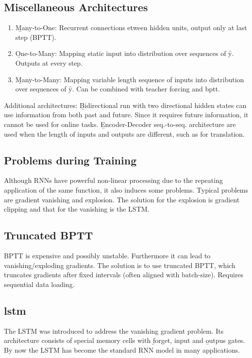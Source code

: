 \subsection{Miscellaneous Architectures}
\begin{enumerate}
    \item \b{Many-to-One:} Recurrent connections etween hidden units, output only at last step (BPTT).
    \item \b{One-to-Many:} Mapping static input into distribution over sequences of \f{y}. Outputs at every step.
    \item \b{Many-to-Many:} Mapping variable length sequence of inputs into distribution over sequences of \f{y}. Can be combined with teacher forcing and \ac{bptt}.
\end{enumerate}

Additional architectures: \b{Bidirectional \ac{rnn}} with two directional hidden states can use information from both past and future. Since it requires future information, it cannot be used for online tasks. \b{Encoder-Decoder seq.-to-seq.} architecture are used when the length of inputs and outputs are different, such as for translation.

\subsection{Problems during Training}
Although RNNs have powerful non-linear processing due to the repeating application of the same function, it also induces some problems. Typical problems are gradient vanishing and explosion. The solution for the explosion is gradient clipping and that for the vanishing is the LSTM.

\subsection{Truncated BPTT}
BPTT is expensive and possibly unstable. Furthermore it can lead to vanishing/exploding gradients. The solution is to use truncated BPTT, which truncates gradients after fixed intervals (often aligned with batch-size). Requires sequential data loading. 

\subsection{\ac{lstm}}
The LSTM was introduced to address the vanishing gradient problem. Its architecture consists of special memory cells with \b{forget, input} and \b{outpus gates}. By now the LSTM has become the standard RNN model in many applications.\\[0.3em]

